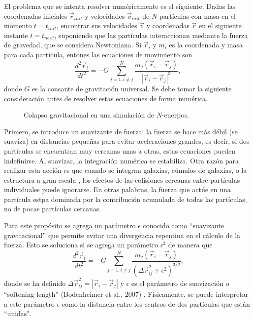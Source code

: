 \documentclass[a4paper,openright,12pt]{book}
\begin{document}
El problema que se intenta resolver numéricamente es el siguiente. Dadas las coordenadas iniciales $\vec{r}_{init}$ y velocidades $\vec{v}_{init}$ de $N$ partículas con masa en el momento $t = t_{init}$, encontrar sus velocidades $\vec{v}$ y coordenadas $\vec{r}$ en el siguiente instante $t = t_{next}$, suponiendo que las partículas interaccionan mediante la fuerza de gravedad, que se considera Newtoniana. Si $\vec{r}_{i}$ y $m_{i}$ es la coordenada y masa para cada partícula, entones las ecuaciones de movimiento son
\begin{equation}
\frac{d^{2}\vec{r}_{i}}{d t^{2}}=
-G \sum_{j=1, i \not= j}^{N} \frac{m_{j}(\vec{r}_{i}-\vec{r}_{j})}{|\vec{r}_{i}-\vec{r}_{j}|^{3}}, \label{eqn 2.8}
\end{equation}
donde $G$ es la consante de gravitación universal. Se debe tomar la siguiente consideración antes de resolver estas ecuaciones de forma numérica.

\begin{figure}
\centering
{}
\caption{\footnotesize{Colapso gravitacional en una simulación de $N$-cuerpos.}}
\end{figure}

Primero, se introduce un suavizante de fuerza: la fuerza se hace más débil (se suaviza) en distancias pequeñas para evitar aceleraciones grandes, es decir, si dos partículas se encuentran muy cercanas unas a otras, estas ecuaciones pueden indefinirse. Al suavizar, la integración numérica se estabiliza. Otra razón para realizar esta acción es que cuando se integran galaxias, cúmulos de galaxias, o la estructura a gran escala , los efectos de las colisiones cercanas entre partículas individuales puede ignorarse. En otras palabras, la fuerza que actúe en una partícula estpa dominada por la contribución acumulada de todas las partículas, no de pocas partículas cercanas.


Para este propósito se agrega un parámetro $\epsilon$ conocido como “suavizante gravitacional” que permite evitar una divergencia repentina en el cálculo de la fuerza. Esto se soluciona si se agrega un parámetro $\epsilon^{2}$ de manera que 
\begin{equation}
\frac{d^{2}\vec{r}_{i}}{d t^{2}}=
-G \sum_{j=1, i \not= j}^{N} \frac{m_{j}(\vec{r}_{i}-\vec{r}_{j})}{(\Delta\vec{r}_{ij}^{2} + \epsilon^{2})^{3/2}},\label{eqn2.7}
\end{equation} 
donde se ha definido $\Delta\vec{r}_{ij}^{2} = |\vec{r}_{i} - \vec{r}_{j}|$ y $\epsilon$ es el parámetro de suavización o “softening length” (Bodenheimer et al., 2007) \cite{b5}. Físicamente, se puede interpretar a este parámetro $\epsilon$ como la distancia entre los centros de dos partículas que están “unidas".
\end{document}
